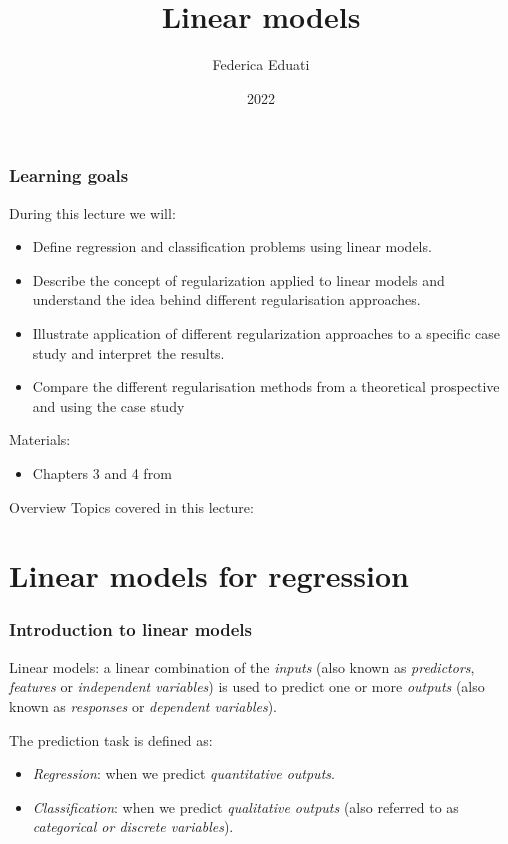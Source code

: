 \documentclass[notes]{beamer}          %
\title{Linear models}
\author{Federica Eduati}
\institute{Eindhoven University of Technology

Department of Biomedical Engineering}
\date{2022}
\begin{document}
 
\frame{\titlepage}
 
\begin{frame}
\frametitle{Learning goals}

During this lecture we will:
\begin{itemize}
	\item Define regression and classification problems using linear models.   
    \item Describe the concept of regularization applied to linear models and understand the idea behind different regularisation approaches. 
    \item Illustrate application of different regularization approaches to a specific case study and interpret the results.
    \item Compare the different regularisation methods from a theoretical prospective and using the case study
\end{itemize}

\vspace{5mm} 

Materials: 
\begin{itemize}
    \item Chapters 3 and 4 from \cite{elements}
\end{itemize}

\end{frame}


\begin{frame}{Overview}
Topics covered in this lecture:
    \tableofcontents
\end{frame}


\section{Linear models for regression}


\begin{frame}
\frametitle{Introduction to linear models}
Linear models: a linear combination of the \textit{inputs} (also known as \textit{predictors}, \textit{features} or \textit{independent variables}) is used to predict one or more \textit{outputs} (also known as \textit{responses} or \textit{dependent variables}).

\vspace{5mm} 

The prediction task is defined as:
\begin{itemize}
    \item \textit{Regression}: when we predict \textit{quantitative outputs}.
    \item \textit{Classification}: when we predict \textit{qualitative outputs} (also referred to as \textit{categorical or discrete variables}).
\end{itemize}

\end{frame}
\end{document}
